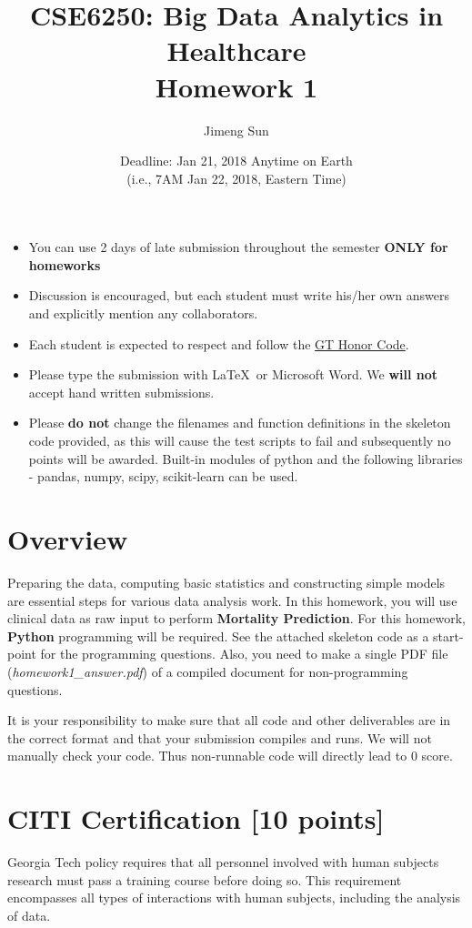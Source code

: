 \documentclass[12pt]{article}
\title{CSE6250: Big Data Analytics in Healthcare \\ Homework 1}
\author{Jimeng Sun}
\date{Deadline: Jan 21, 2018 Anytime on Earth\\ (i.e., 7AM Jan 22, 2018, Eastern Time)}
\begin{document}
\maketitle
\begin{itemize}
\item You can use 2 days of late submission throughout the semester \textbf{ONLY for homeworks}
\item Discussion is encouraged, but each student must write his/her own answers and explicitly mention any collaborators.
\item Each student is expected to respect and follow the \href{http://www.honor.gatech.edu/}{ GT Honor Code}.
\item Please type the submission with \LaTeX\ or Microsoft Word. We \textbf{will not} accept hand written submissions.
\item Please \textbf{do not} change the filenames and function definitions in the skeleton code provided, as this will cause the test scripts to fail and subsequently no points will be awarded. Built-in modules of python and the following libraries -  pandas, numpy, scipy, scikit-learn can be used. 
\end{itemize}

\section*{Overview}

Preparing the data, computing basic statistics and constructing simple models are essential steps for various data analysis work. In this homework, you will use clinical data as raw input to perform \textbf{Mortality Prediction}. For this homework, \textbf{Python} programming will be required. See the attached skeleton code as a start-point for the programming questions. Also, you need to make a single PDF file (\textit{homework1\_answer.pdf}) of a compiled document for non-programming questions.

It is your responsibility to make sure that all code and other deliverables are in the correct format and that your submission compiles and runs. We will not manually check your code. Thus non-runnable code will directly lead to 0 score.

\section{CITI Certification  [10 points] }%
Georgia Tech policy requires that all personnel involved with human subjects research must pass a training course before doing so. This requirement encompasses all types of interactions with human subjects, including the analysis of data. 
\end{document}
